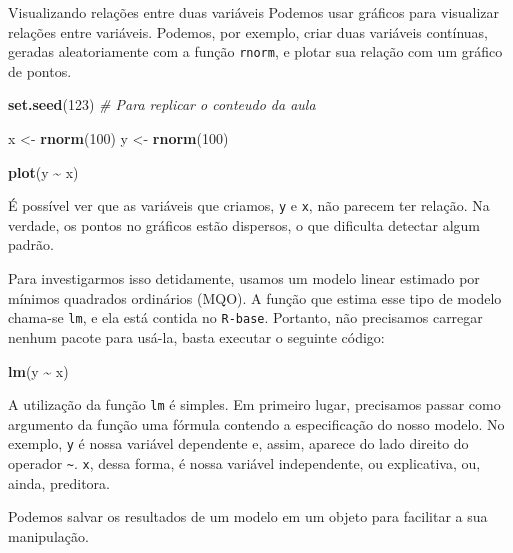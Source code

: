 \documentclass[
  9pt,
  ignorenonframetext,
  aspectratio=169]{beamer}
\newenvironment{Shaded}{\begin{snugshade}}{\end{snugshade}}
\newcommand{\CommentTok}[1]{\textcolor[rgb]{0.56,0.35,0.01}{\textit{#1}}}
\newcommand{\DecValTok}[1]{\textcolor[rgb]{0.00,0.00,0.81}{#1}}
\newcommand{\KeywordTok}[1]{\textcolor[rgb]{0.13,0.29,0.53}{\textbf{#1}}}
\newcommand{\NormalTok}[1]{#1}
\newcommand{\OperatorTok}[1]{\textcolor[rgb]{0.81,0.36,0.00}{\textbf{#1}}}
\newcommand{\StringTok}[1]{\textcolor[rgb]{0.31,0.60,0.02}{#1}}
\begin{document}
\begin{frame}[fragile]{Visualizando relações entre duas variáveis}
\protect\hypertarget{visualizando-relauxe7uxf5es-entre-duas-variuxe1veis}{}
Podemos usar gráficos para visualizar relações entre variáveis. Podemos,
por exemplo, criar duas variáveis contínuas, geradas aleatoriamente com
a função \texttt{rnorm}, e plotar sua relação com um gráfico de pontos.

\begin{Shaded}
\begin{Highlighting}[]
\KeywordTok{set.seed}\NormalTok{(}\DecValTok{123}\NormalTok{) }\CommentTok{\# Para replicar o conteudo da aula}

\NormalTok{x \textless{}{-}}\StringTok{ }\KeywordTok{rnorm}\NormalTok{(}\DecValTok{100}\NormalTok{)}
\NormalTok{y \textless{}{-}}\StringTok{ }\KeywordTok{rnorm}\NormalTok{(}\DecValTok{100}\NormalTok{)}

\KeywordTok{plot}\NormalTok{(y }\OperatorTok{\textasciitilde{}}\StringTok{ }\NormalTok{x)}
\end{Highlighting}
\end{Shaded}

É possível ver que as variáveis que criamos, \texttt{y} e \texttt{x},
não parecem ter relação. Na verdade, os pontos no gráficos estão
dispersos, o que dificulta detectar algum padrão.

Para investigarmos isso detidamente, usamos um modelo linear estimado
por mínimos quadrados ordinários (MQO). A função que estima esse tipo de
modelo chama-se \texttt{lm}, e ela está contida no \texttt{R-base}.
Portanto, não precisamos carregar nenhum pacote para usá-la, basta
executar o seguinte código:

\begin{Shaded}
\begin{Highlighting}[]
\KeywordTok{lm}\NormalTok{(y }\OperatorTok{\textasciitilde{}}\StringTok{ }\NormalTok{x)}
\end{Highlighting}
\end{Shaded}

A utilização da função \texttt{lm} é simples. Em primeiro lugar,
precisamos passar como argumento da função uma fórmula contendo a
especificação do nosso modelo. No exemplo, \texttt{y} é nossa variável
dependente e, assim, aparece do lado direito do operador
\texttt{\textasciitilde{}}. \texttt{x}, dessa forma, é nossa variável
independente, ou explicativa, ou, ainda, preditora.

Podemos salvar os resultados de um modelo em um objeto para facilitar a
sua manipulação.


\end{frame}
\end{document}
